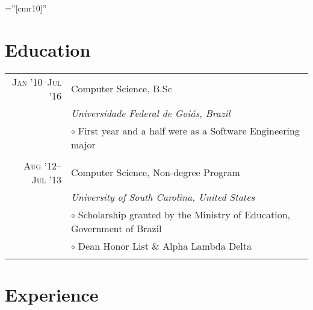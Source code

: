 \documentclass[a4paper,10pt]{article}
\begin{document}
\font\fb=''[cmr10]''


\section{Education}

\begin{tabular}{r|p{11cm}}

  \textsc{Jan '10--Jul '16} & Computer Science, B.Sc\\ &
  \emph{Universidade Federal de Goiás, Brazil} \\ &
  \footnotesize{$\circ$ First year and a half were as a Software Engineering major}
  \\\multicolumn{2}{c}{} \\

  \textsc{Aug '12--Jul '13} & Computer Science, Non-degree Program \\ &
  \emph{University of South Carolina, United States} \\ &
  \footnotesize{$\circ$ Scholarship granted by the Ministry of Education, Government of Brazil} \\ &
  \footnotesize{$\circ$ Dean Honor List \& Alpha Lambda Delta}
  \\\multicolumn{2}{c}{} \\
 
\end{tabular}

\section{Experience}

\setlength{\LTpre}{0pt}
\setlength{\LTpost}{0pt}
\end{document}
